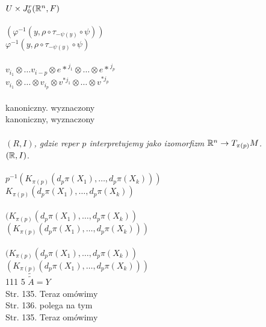 \documentclass[a4paper,11pt]{article}
\begin{document}
\Powin $U \times J^{ r }_{ 0 }( \mathbb{R}^{ n }, F )$ \\
 \\
\Jest $( \varphi^{ -1 }( y, \rho \circ \tau_{ -\psi( y ) } \circ \psi ) )$ \\[0.5em]
\Powin $\varphi^{ -1 }( y, \rho \circ \tau_{ -\psi( y ) } \circ \psi )$ \\
 \\
\Jest  $v_{ i_{ 1 } } \otimes \ldots v_{ i - p } \otimes { e* }^{ j_{ 1 } }
\otimes \ldots \otimes { e* }^{ j_{ p } }$ \\[0.3em]
\Powin $v_{ i_{ 1 } } \otimes \ldots \otimes v_{ i_{ p } } \otimes v^{ * j_{ 1 } }
\otimes \ldots \otimes v^{ * j_{ p } }$ \\[0.3em]
 \\
\Jest  kanoniczny. wyznaczony \\
\Powin kanoniczny, wyznaczony \\
 \\
\Jest \textit{$( R, I )$, gdzie reper $p$ interpretujemy jako izomorfizm
  $\mathbb{R}^{ n } \to T_{ \pi( p ) }M$.} \\
\Powin $( \mathbb{R}, I )$. \\
 \\[0.3em]
\Jest  $p^{ -1 }( K_{ \pi( p ) }( d_{ p }\pi( X_{ 1 } ), \ldots,
d_{ p }\pi( X_{ k } ) ) )$ \\[0.5em]
\Powin $K_{ \pi( p ) }( d_{ p }\pi( X_{ 1 } ), \ldots, d_{ p }\pi( X_{ k } ) )$ \\[0.3em]
 \\[0.3em]
\Jest  $( K_{ \pi( p ) }( d_{ p }\pi( X_{ 1 } ), \ldots,
d_{ p }\pi( X_{ k } ) )$ \\[0.3em]
\Powin $( K_{ \pi( p ) }( d_{ p }\pi( X_{ 1 } ), \ldots,
d_{ p }\pi( X_{ k } ) ) )$ \\[0.3em]
 \\[0.3em]
\Jest  $( K_{ \pi( p ) }( d_{ p }\pi( X_{ 1 } ), \ldots,
d_{ p }\pi( X_{ k } ) )$ \\[0.3em]
\Powin $( K_{ \pi( p ) }( d_{ p }\pi( X_{ 1 } ), \ldots,
d_{ p }\pi( X_{ k } ) ) )$ \\


111 5 $\widetilde{ \widetilde{ A } } = Y$ \\
Str. 135. Teraz omówimy \\
Str. 136. polega na tym \\
Str. 135. Teraz omówimy \\
\end{document}

